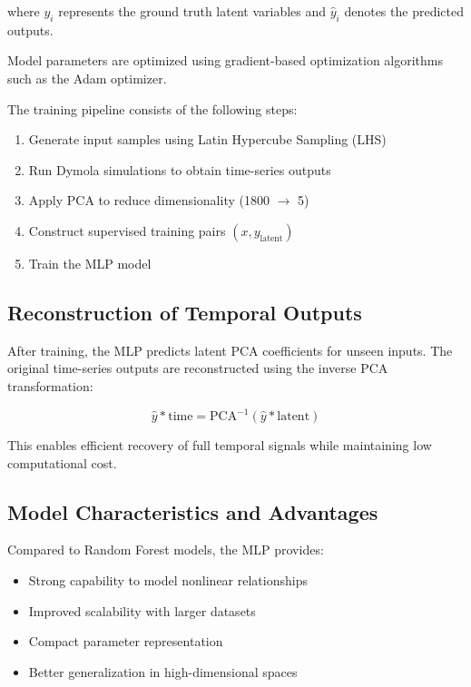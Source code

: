 where $y_i$ represents the ground truth latent variables and $\hat{y}_i$ denotes the predicted outputs.

Model parameters are optimized using gradient-based optimization algorithms such as the Adam optimizer.

The training pipeline consists of the following steps:

\begin{enumerate}
\item Generate input samples using Latin Hypercube Sampling (LHS)
\item Run Dymola simulations to obtain time-series outputs
\item Apply PCA to reduce dimensionality (1800 $\rightarrow$ 5)
\item Construct supervised training pairs $(x, y_{\text{latent}})$
\item Train the MLP model
\end{enumerate}

\subsection{Reconstruction of Temporal Outputs}

After training, the MLP predicts latent PCA coefficients for unseen inputs. The original time-series outputs are reconstructed using the inverse PCA transformation:

\begin{equation}
\hat{y}*{\text{time}} = \text{PCA}^{-1}(\hat{y}*{\text{latent}})
\end{equation}

This enables efficient recovery of full temporal signals while maintaining low computational cost.

\subsection{Model Characteristics and Advantages}

Compared to Random Forest models, the MLP provides:

\begin{itemize}
\item Strong capability to model nonlinear relationships
\item Improved scalability with larger datasets
\item Compact parameter representation
\item Better generalization in high-dimensional spaces
\end{itemize}


